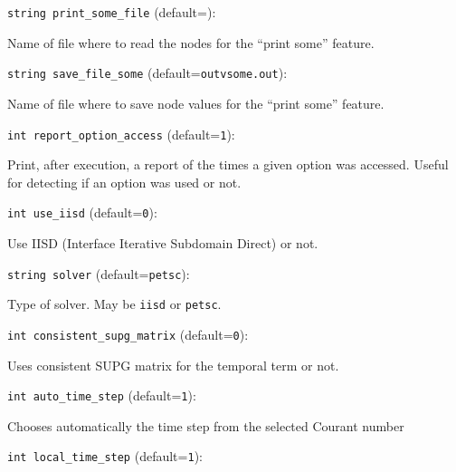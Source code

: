 \item\verb+string print_some_file+ {\rm(default=\verb||)}:

Name of file where to read the nodes for the ``print some'' 
feature. 

\item\verb+string save_file_some+ {\rm(default=\verb|outvsome.out|)}:

Name of file where to save node values for the ``print some'' 
feature. 

\item\verb+int report_option_access+ {\rm(default=\verb|1|)}:

Print, after execution, a report of the times a given option
was accessed. Useful for detecting if an option was used or not.

\item\verb+int use_iisd+ {\rm(default=\verb|0|)}:

Use IISD (Interface Iterative Subdomain Direct) or not.

\item\verb+string solver+ {\rm(default=\verb|petsc|)}:

Type of solver. May be \verb+iisd+ or \verb+petsc+. 

\item\verb+int consistent_supg_matrix+ {\rm(default=\verb|0|)}:

Uses consistent SUPG matrix for the temporal term or not. 

\item\verb+int auto_time_step+ {\rm(default=\verb|1|)}:

Chooses automatically the time step from the 
selected Courant number

\item\verb+int local_time_step+ {\rm(default=\verb|1|)}:

